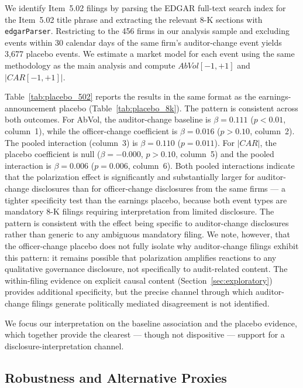 \documentclass[12pt]{article}
\begin{document}
We identify Item~5.02 filings by parsing the EDGAR full-text search index
for the Item~5.02 title phrase and extracting the relevant 8-K sections
with \texttt{edgarParser}. Restricting to the 456 firms in our analysis
sample and excluding events within 30 calendar days of the same firm's
auditor-change event yields 3,677 placebo events. We estimate a market
model for each event using the same methodology as the main analysis and
compute $AbVol[-1,+1]$ and $|CAR[-1,+1]|$.

Table~\ref{tab:placebo_502} reports the results in the same format as the
earnings-announcement placebo (Table~\ref{tab:placebo_8k}). The pattern
is consistent across both outcomes. For AbVol, the auditor-change baseline
is $\beta = 0.111$ ($p < 0.01$, column~1), while the officer-change
coefficient is $\beta = 0.016$ ($p > 0.10$, column~2). The pooled
interaction (column~3) is $\beta = 0.110$ ($p = 0.011$). For $|CAR|$, the
placebo coefficient is null ($\beta = -0.000$, $p > 0.10$, column~5) and
the pooled interaction is $\beta = 0.006$ ($p = 0.006$, column~6). Both
pooled interactions indicate that the polarization effect is significantly
and substantially larger for auditor-change disclosures than for
officer-change disclosures from the same firms --- a tighter specificity
test than the earnings placebo, because both event types are mandatory
8-K filings requiring interpretation from limited disclosure. The
pattern is consistent with the effect being specific to auditor-change
disclosures rather than generic to any ambiguous mandatory filing. We
note, however, that the officer-change placebo does not fully isolate
why auditor-change filings exhibit this pattern: it remains possible
that polarization amplifies reactions to any qualitative governance
disclosure, not specifically to audit-related content. The within-filing
evidence on explicit causal content (Section~\ref{sec:exploratory})
provides additional specificity, but the precise channel through which
auditor-change filings generate politically mediated disagreement is not
identified.



We focus our interpretation on the baseline association and the placebo
evidence, which together provide the clearest --- though not
dispositive --- support for a disclosure-interpretation channel.

\subsection{Robustness and Alternative Proxies}
\end{document}
